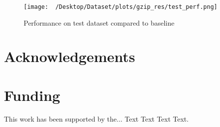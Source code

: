 \documentclass{bioinfo}
\begin{document}
\begin{figure}[!thbp]
\texttt{[image: ~/Desktop/Dataset/plots/gzip\_res/test\_perf.png]}
\caption{Performance on test dataset compared to baseline}\label{fig:01}
\end{figure}




\section*{Acknowledgements}

\lipsum[1]

\section*{Funding}

This work has been supported by the... Text Text  Text Text.\vspace*{-12pt}
\end{document}
